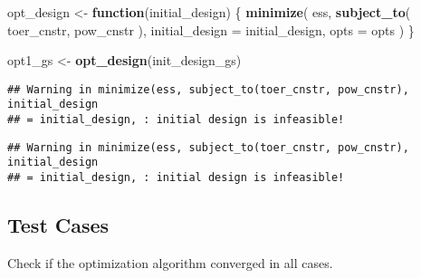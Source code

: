 \documentclass[]{book}
\newenvironment{Shaded}{\begin{snugshade}}{\end{snugshade}}
\newcommand{\ControlFlowTok}[1]{\textcolor[rgb]{0.13,0.29,0.53}{\textbf{#1}}}
\newcommand{\DataTypeTok}[1]{\textcolor[rgb]{0.13,0.29,0.53}{#1}}
\newcommand{\DecValTok}[1]{\textcolor[rgb]{0.00,0.00,0.81}{#1}}
\newcommand{\FloatTok}[1]{\textcolor[rgb]{0.00,0.00,0.81}{#1}}
\newcommand{\KeywordTok}[1]{\textcolor[rgb]{0.13,0.29,0.53}{\textbf{#1}}}
\newcommand{\NormalTok}[1]{#1}
\newcommand{\OperatorTok}[1]{\textcolor[rgb]{0.81,0.36,0.00}{\textbf{#1}}}
\newcommand{\StringTok}[1]{\textcolor[rgb]{0.31,0.60,0.02}{#1}}
\begin{document}
\begin{Shaded}
\begin{Highlighting}[]
\NormalTok{opt_design <-}\StringTok{ }\ControlFlowTok{function}\NormalTok{(initial_design) \{}
    \KeywordTok{minimize}\NormalTok{(}
\NormalTok{        ess,}
        \KeywordTok{subject_to}\NormalTok{(}
\NormalTok{            toer_cnstr,}
\NormalTok{            pow_cnstr}
\NormalTok{        ),}
        \DataTypeTok{initial_design =}\NormalTok{ initial_design,}
        \DataTypeTok{opts =}\NormalTok{ opts}
\NormalTok{    )}
\NormalTok{\}}

\NormalTok{opt1_gs <-}\StringTok{ }\KeywordTok{opt_design}\NormalTok{(init_design_gs)}
\end{Highlighting}
\end{Shaded}

\begin{verbatim}
## Warning in minimize(ess, subject_to(toer_cnstr, pow_cnstr), initial_design
## = initial_design, : initial design is infeasible!
\end{verbatim}

\begin{Shaded}
\end{Shaded}

\begin{verbatim}
## Warning in minimize(ess, subject_to(toer_cnstr, pow_cnstr), initial_design
## = initial_design, : initial design is infeasible!
\end{verbatim}

\hypertarget{test-cases-3}{%
\subsection{Test Cases}\label{test-cases-3}}

Check if the optimization algorithm converged in all cases.

\begin{Shaded}
\end{Shaded}
\end{document}
